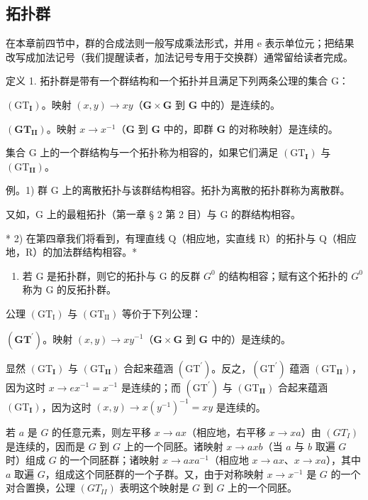 \subsection{拓扑群}

在本章前四节中，群的合成法则一般写成乘法形式，并用 e 表示单位元；把结果改写成加法记号（我们提醒读者，加法记号专用于交换群）通常留给读者完成。

定义 1. 拓扑群是带有一个群结构和一个拓扑并且满足下列两条公理的集合 G：

\((\mathrm{GT}_{\mathbf{I}})\)。映射 \((x, y) \to xy\)（\(\mathbf{G} \times \mathbf{G}\) 到 \(\mathbf{G}\) 中的）是连续的。

\((\mathbf{G}\mathbf{T}_{\mathbf{II}})\)。映射 \(x \to x^{-1}\)（\(\mathbf{G}\) 到 \(\mathbf{G}\) 中的，即群 \(\mathbf{G}\) 的对称映射）是连续的。

集合 G 上的一个群结构与一个拓扑称为相容的，如果它们满足 \((\mathrm{GT}_{\mathbf{I}})\) 与 \((\mathrm{GT}_{\mathbf{II}})\)。

例。1) 群 G 上的离散拓扑与该群结构相容。拓扑为离散的拓扑群称为离散群。

又如，G 上的最粗拓扑（第一章 § 2 第 2 目）与 G 的群结构相容。

* 2) 在第四章我们将看到，有理直线 Q（相应地，实直线 R）的拓扑与 Q（相应地，R）的加法群结构相容。*

\begin{enumerate}
\def\labelenumi{\arabic{enumi})}
\setcounter{enumi}{2}
\tightlist
\item
  若 G 是拓扑群，则它的拓扑与 G 的反群 \(G^{0}\) 的结构相容；赋有这个拓扑的 \(G^{0}\) 称为 G 的反拓扑群。
\end{enumerate}

公理 \((\mathrm{GT}_{\mathrm{I}})\) 与 \((\mathrm{GT}_{\mathrm{II}})\) 等价于下列公理：

\((\mathbf{GT}^{\prime})\)。映射 \((x,y)\to xy^{-1}\)（\(\mathbf{G}\times \mathbf{G}\) 到 \(\mathbf{G}\) 中的）是连续的。

显然 \((\mathrm{GT}_{\mathbf{I}})\) 与 \((\mathrm{GT}_{\mathbf{II}})\) 合起来蕴涵 \((\mathrm{GT}^{\prime})\)。反之，\((\mathrm{GT}^{\prime})\) 蕴涵 \((\mathrm{GT}_{\mathbf{II}})\)，因为这时 \(x \to ex^{-1} = x^{-1}\) 是连续的；而 \((\mathrm{GT}^{\prime})\) 与 \((\mathrm{GT}_{\mathbf{II}})\) 合起来蕴涵 \((\mathrm{GT}_{\mathbf{I}})\)，因为这时 \((x, y) \to x(y^{-1})^{-1} = xy\) 是连续的。

若 \(a\) 是 \(G\) 的任意元素，则左平移 \(x \to ax\)（相应地，右平移 \(x \to xa\)）由 \((GT_{I})\) 是连续的，因而是 \(G\) 到 \(G\) 上的一个同胚。诸映射 \(x \to axb\)（当 \(a\) 与 \(b\) 取遍 \(G\) 时）组成 \(G\) 的一个同胚群；诸映射 \(x \to axa^{-1}\)（相应地 \(x \to ax\)、\(x \to xa\)），其中 \(a\) 取遍 \(G\)，组成这个同胚群的一个子群。又，由于对称映射 \(x \to x^{-1}\) 是 \(G\) 的一个对合置换，公理 \((GT_{II})\) 表明这个映射是 \(G\) 到 \(G\) 上的一个同胚。

